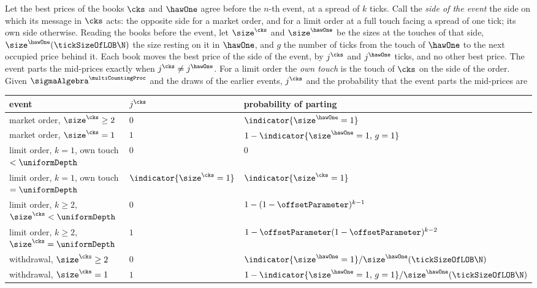 \begin{prop}\label{prop.partingProbability}
 Let the best prices of the books $\cks$ and $\hawOne$ agree before the $n$-th event,
 at a spread of $k$ ticks.
 Call the \emph{side of the event} the side on which its message in $\cks$ acts:
 the opposite side for a market order,
 and for a limit order at a full touch facing a spread of one tick;
 its own side otherwise.
 Reading the books before the event,
 let $\size^{\cks}$ and $\size^{\hawOne}$ be the sizes at the touches of that side,
 $\size^{\hawOne}(\tickSizeOfLOB\N)$ the size resting on it in $\hawOne$,
 and $g$ the number of ticks from the touch of $\hawOne$ to the next occupied price behind it.
 Each book moves the best price of the side of the event,
 by $j^{\cks}$ and $j^{\hawOne}$ ticks,
 and no other best price.
 The event parts the mid-prices exactly when $j^{\cks} \neq j^{\hawOne}$.
 For a limit order the \emph{own touch} is the touch of $\cks$ on the side of the order.
 Given $\sigmaAlgebra^{\multiCountingProc}$ and the draws of the earlier events,
 $j^{\cks}$ and the probability that the event parts the mid-prices are
 \begin{center}
  \begin{tabular}{lll}
   \toprule
   event & $j^{\cks}$ & probability of parting \\
   \midrule
   market order, $\size^{\cks} \geq 2$
   & $0$
   & $\indicator{\size^{\hawOne} = 1}$ \\
   market order, $\size^{\cks} = 1$
   & $1$
   & $1 - \indicator{\size^{\hawOne} = 1, \, g = 1}$ \\
   limit order, $k = 1$, own touch $< \uniformDepth$
   & $0$
   & $0$ \\
   limit order, $k = 1$, own touch $= \uniformDepth$
   & $\indicator{\size^{\cks} = 1}$
   & $\indicator{\size^{\cks} = 1}$ \\
   limit order, $k \geq 2$, $\size^{\cks} < \uniformDepth$
   & $0$
   & $1 - (1-\offsetParameter)^{k-1}$ \\
   limit order, $k \geq 2$, $\size^{\cks} = \uniformDepth$
   & $1$
   & $1 - \offsetParameter(1-\offsetParameter)^{k-2}$ \\
   withdrawal, $\size^{\cks} \geq 2$
   & $0$
   & $\indicator{\size^{\hawOne} = 1} / \size^{\hawOne}(\tickSizeOfLOB\N)$ \\
   withdrawal, $\size^{\cks} = 1$
   & $1$
   & $1 - \indicator{\size^{\hawOne} = 1, \, g = 1} / \size^{\hawOne}(\tickSizeOfLOB\N)$ \\
   \bottomrule
  \end{tabular}
 \end{center}
\end{prop}
